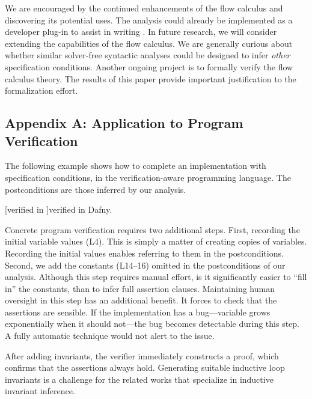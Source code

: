 We are encouraged by the continued enhancements of the flow calculus and discovering its potential uses.
The analysis could already be implemented as a developer plug-in to assist in writing .
In future research, we will consider extending the capabilities of the flow calculus.
We are generally curious about whether similar solver-free syntactic analyses could be designed to infer \emph{other} specification conditions. %
Another ongoing project is to formally verify the flow calculus theory.
The results of this paper provide important justification to the formalization effort.

\clearpage

\subsection{Appendix A: Application to Program Verification}
\label{app:sec:verified}

The following example shows how to complete an implementation with specification
conditions, in the verification-aware  programming language. The
postconditions are those inferred by our analysis.

\begin{center}
\begin{minipage}{\textwidth}
\captionsetup{type=lstlisting}
[\exname verified in ]{\exname verified in Dafny.}
\label{lst:dafny-ex}
\end{minipage}
\end{center}

Concrete program verification requires two additional steps. First, recording
the initial variable values (L4). This is simply a matter of creating copies of
variables. Recording the initial values enables referring to them in the
postconditions. Second, we add the constants (L14--16) omitted in the
postconditions of our analysis. Although this step requires manual effort, is it
significantly easier to \enquote{fill in} the constants, than to infer full
assertion clauses. Maintaining human oversight in this step has an additional
benefit. It forces to check that the assertions are sensible. If the
implementation has a bug---\eg variable grows exponentially when it should
not---the bug becomes detectable during this step. A fully automatic technique
would not alert to the issue.

After adding invariants, the  verifier immediately constructs a proof,
which confirms that the assertions always hold. Generating suitable inductive
loop invariants is a challenge for the related works that specialize in
inductive invariant inference.

